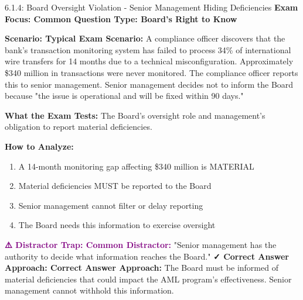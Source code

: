\documentclass[11pt,a4paper]{beamer}
\newcommand{\examfocus}[1]{\textcolor{orange!80!black}{\textbf{Exam Focus: #1}}}
\newcommand{\trap}[1]{\textcolor{purple}{\textbf{⚠️ Distractor Trap: #1}}}
\newcommand{\correct}[1]{\textcolor{green!50!black}{\textbf{✓ Correct Answer Approach: #1}}}
\newcommand{\scenario}[1]{\textcolor{blue!70!black}{\textbf{Scenario: #1}}}
\begin{document}
	\begin{frame}{6.1.4: Board Oversight Violation - Senior Management Hiding Deficiencies}
		\examfocus{Common Question Type: Board's Right to Know}
		
		\scenario{Typical Exam Scenario:}
		A compliance officer discovers that the bank's transaction monitoring system has failed to process 34\% of international wire transfers for 14 months due to a technical misconfiguration. Approximately \$340 million in transactions were never monitored. The compliance officer reports this to senior management. Senior management decides not to inform the Board because "the issue is operational and will be fixed within 90 days."
		
		\textbf{What the Exam Tests:} The Board's oversight role and management's obligation to report material deficiencies.
		
		\textbf{How to Analyze:}
		\begin{enumerate}
			\item A 14-month monitoring gap affecting \$340 million is MATERIAL
			\item Material deficiencies MUST be reported to the Board
			\item Senior management cannot filter or delay reporting
			\item The Board needs this information to exercise oversight
		\end{enumerate}
		
		\trap{Common Distractor:} "Senior management has the authority to decide what information reaches the Board."
		\correct{Correct Answer Approach:} The Board must be informed of material deficiencies that could impact the AML program's effectiveness. Senior management cannot withhold this information.
	\end{frame}
	
\end{document}
